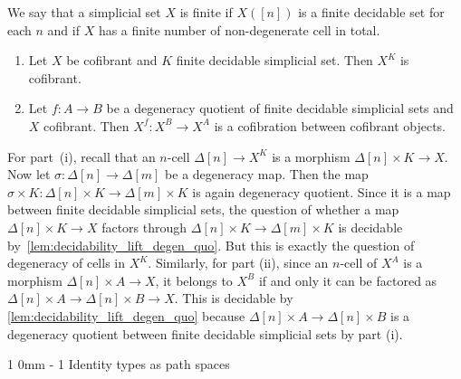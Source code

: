 \documentclass[reqno,10pt,a4paper,oneside]{amsart}
\makeatletter
\renewenvironment{proof}[1][\proofname] {\par\pushQED{\qed}\normalfont\topsep6\p@\@plus6\p@\relax\trivlist\item[\hskip\labelsep\bf#1\@addpunct{.}]\ignorespaces}{\popQED\endtrivlist\@endpefalse}
\renewcommand{\section}{\@startsection
{section}%
{1}%
{0mm}%
{-\baselineskip}%
{1\baselineskip}%
{\Large \bfseries}}%
\numberwithin{equation}{section}
\theoremstyle{mythm}
\theoremstyle{mydef}
\theoremstyle{myrmk}
\newcommand{\co}{\colon}
\makeatother
\begin{document}
We say that a simplicial set $X$ is finite if $X([n])$ is a finite decidable set for each $n$ and if $X$ has a finite number of non-degenerate cell in total.



\begin{lemma} \label{prop:X^kCofibrant}  \hfill 
\begin{enumerate}[$(i)$]
\item Let $X$ be cofibrant and $K$ finite decidable simplicial set. Then $X^K$ is cofibrant.
\item Let $f \co A \rightarrow B$ be a degeneracy quotient of finite decidable simplicial sets and $X$  cofibrant. Then $X^f \co X^B \rightarrow X^A$ is a cofibration between cofibrant objects.
\end{enumerate}
\end{lemma}

\begin{proof}  For part~(i), recall that an $n$-cell $\Delta[n] \rightarrow X^K$ is a morphism $\Delta[n] \times K \rightarrow X$. Now let $\sigma \co \Delta[n] \rightarrow \Delta[m]$ be a degeneracy map. Then the map 
$\sigma \times K \co \Delta[n] \times K \rightarrow \Delta[m] \times K$ is again degeneracy quotient.
Since it is a map between finite decidable simplicial sets, the question of whether a map $\Delta[n] \times K \rightarrow X$ factors through $\Delta[n] \times K \rightarrow \Delta[m] \times K$ is decidable
by~\cref{lem:decidability_lift_degen_quo}. But this is exactly the question of degeneracy of cells in $X^K$.
Similarly, for part (ii), since an $n$-cell of $X^A$ is a morphism $\Delta[n] \times A \rightarrow X$, it belongs to $X^B$ if and only it can be factored as $\Delta[n] \times A \rightarrow \Delta[n] \times B \rightarrow X$. This is decidable by \cref{lem:decidability_lift_degen_quo} because $\Delta[n] \times A \rightarrow \Delta[n] \times B$ is a degeneracy quotient between finite decidable simplicial sets by part (i).
\end{proof} 








\section{Identity types as path spaces}
\label{sec:pats}
\end{document}
